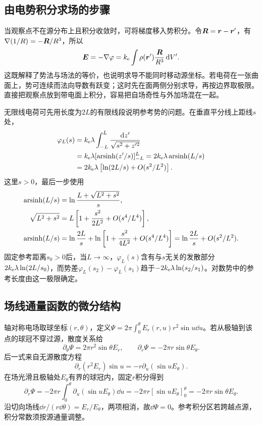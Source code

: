 \subsection{由电势积分求场的步骤}
当观察点不在源分布上且积分收敛时，可将梯度移入势积分。令$\bm{R}=\bm{r}-\bm{r}'$，有$\nabla(1/R)=-\bm{R}/R^3$，所以
\[\bm{E}=-\nabla\varphi=k_{\rm e}\int\rho(\bm{r}')\frac{\bm{R}}{R^3}\mathop{}\!\mathrm d V'.\]
这既解释了势法与场法的等价，也说明求导不能同时移动源坐标。若电荷在一张曲面上，势可连续而法向导数有跃变；这时先在面两侧分别求导，再按边界取极限。直接把观察点放到带电面上积分，容易把自场奇性与外加场混在一起。

无限线电荷可先用长度为$2L$的有限线段说明参考势的问题。在垂直平分线上距线$s$处，
\[\begin{aligned}
\varphi_L(s)&=k_{\rm e}\lambda\int_{-L}^L\frac{\mathop{}\!\mathrm d z'}{\sqrt{s^2+z'^2}}\\
&=k_{\rm e}\lambda[\operatorname{arsinh}(z'/s)]_{-L}^L=2k_{\rm e}\lambda\operatorname{arsinh}(L/s)\\
&=2k_{\rm e}\lambda\left[\ln(2L/s)+O(s^2/L^2)\right].
\end{aligned}
\]
这里$s>0$，最后一步使用
\[\begin{aligned}
\operatorname{arsinh}(L/s)&=\ln\frac{L+\sqrt{L^2+s^2}}s,\\
\sqrt{L^2+s^2}&=L\left[1+\frac{s^2}{2L^2}+O(s^4/L^4)\right],\\
\operatorname{arsinh}(L/s)&=\ln\frac{2L}s+
\ln\left[1+\frac{s^2}{4L^2}+O(s^4/L^4)\right]
=\ln\frac{2L}s+O(s^2/L^2).
\end{aligned}\]
固定参考距离$s_0>0$后，当$L\to\infty$，$\varphi_L(s)$含有与$s$无关的发散部分$2k_{\rm e}\lambda\ln(2L/s_0)$，而势差$\varphi_L(s_2)-\varphi_L(s_1)$趋于$-2k_{\rm e}\lambda\ln(s_2/s_1)$。对数势中的参考长度由这一极限确定。

\subsection{场线通量函数的微分结构}
轴对称电场取球坐标$(r,\theta)$，定义$\Psi=2\pi\int_0^\theta E_r(r,u)r^2\sin u\dd u$。若从极轴到该点的球冠不穿过源，散度关系给
\[\partial_\theta\Psi=2\pi r^2\sin\theta E_r,\qquad
\partial_r\Psi=-2\pi r\sin\theta E_\theta.
\]
后一式来自无源散度方程
\[\partial_r(r^2E_r)\sin u=-r\partial_u(\sin uE_\theta).\]
在场光滑且极轴处$E_\theta$有界的球冠内，固定$r$积分得到
\[\partial_r\Psi=-2\pi r\int_0^\theta\partial_u(\sin uE_\theta)\dd u
=-2\pi r[\sin uE_\theta]_0^\theta=-2\pi r\sin\theta E_\theta.\]
沿切向场线$\dd r/(r\dd\theta)=E_r/E_\theta$，两项相消，故$\dd\Psi=0$。参考积分区若跨越点源，积分常数须按源通量调整。

